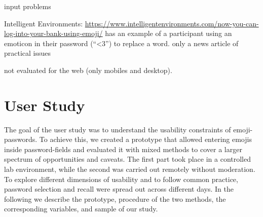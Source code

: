 \cite{Pohl2017BeyondTextEmoji} input problems

\cite{Golla2017EmojiAuth, Kraus2017Emoji}
Intelligent Environments: \url{https://www.intelligentenvironments.com/now-you-can-log-into-your-bank-using-emoji/}
\cite{Kuo2006HumanSelectionMnemonic} has an example of a participant using an emoticon in their password (``<3'') to replace a word. 
\cite{Dashinsky2015NoEmojisInPWs} only a news article of practical issues
\cite{Malih2015ThesisEmojiPWs}

not evaluated for the web (only mobiles and desktop).


\section{User Study}
The goal of the user study was to understand the usability constraints of emoji-passwords. To achieve this, we created a prototype that allowed entering emojis inside password-fields and evaluated it with mixed methods to cover a larger spectrum of opportunities and caveats. The first part took place in a controlled lab environment, while the second was carried out remotely without moderation. To explore different dimensions of usability and to follow common practice, password selection and recall were spread out across different days. In the following we describe the prototype, procedure of the two methods, the corresponding variables, and sample of our study. 

